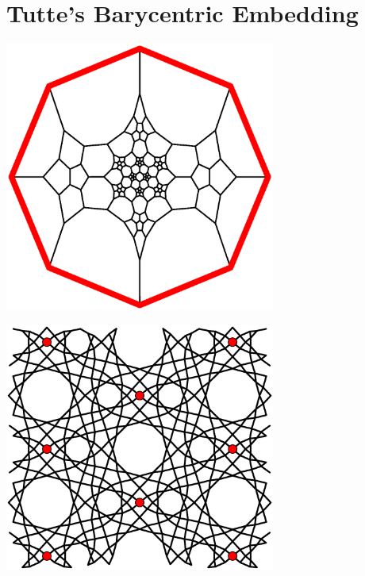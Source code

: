 \documentclass{beamer}
\begin{document}
\section{Tutte's Barycentric Embedding}

\begin{frame}
  \begin{center}
    \includegraphics[width=3.5in]{schlegel2}
  \end{center}
\end{frame}

\begin{frame}
  \begin{center}
    \includegraphics[width=3.5in]{al-equilibrium}
  \end{center}
\end{frame}
\end{document}
